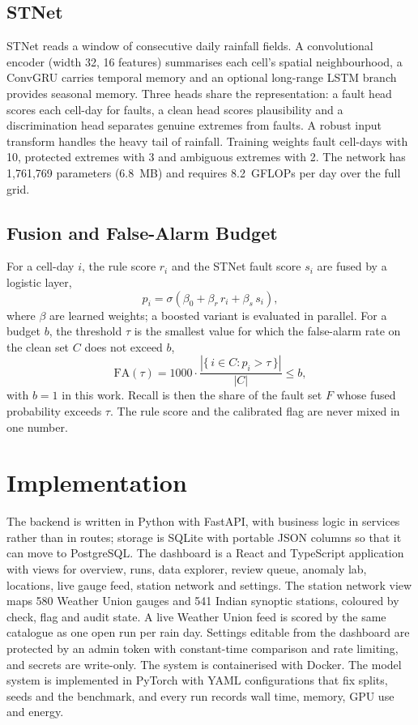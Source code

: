 \documentclass[conference,a4paper]{IEEEtran}
\begin{document}
\subsection{STNet}
STNet reads a window of consecutive daily rainfall fields. A convolutional encoder (width 32, 16 features) summarises each cell's spatial neighbourhood, a ConvGRU carries temporal memory and an optional long-range LSTM branch provides seasonal memory. Three heads share the representation: a fault head scores each cell-day for faults, a clean head scores plausibility and a discrimination head separates genuine extremes from faults. A robust input transform handles the heavy tail of rainfall. Training weights fault cell-days with 10, protected extremes with 3 and ambiguous extremes with 2. The network has 1,761,769 parameters (6.8~MB) and requires 8.2~GFLOPs per day over the full grid.

\subsection{Fusion and False-Alarm Budget}
For a cell-day $i$, the rule score $r_i$ and the STNet fault score $s_i$ are fused by a logistic layer,
\begin{equation}
p_i = \sigma\!\left(\beta_0 + \beta_r\, r_i + \beta_s\, s_i\right),
\label{eq:fusion}
\end{equation}
where $\beta$ are learned weights; a boosted variant is evaluated in parallel. For a budget $b$, the threshold $\tau$ is the smallest value for which the false-alarm rate on the clean set $C$ does not exceed $b$,
\begin{equation}
\mathrm{FA}(\tau) = 1000\cdot\frac{\left|\{\,i\in C : p_i > \tau\,\}\right|}{|C|} \le b,
\label{eq:budget}
\end{equation}
with $b=1$ in this work. Recall is then the share of the fault set $F$ whose fused probability exceeds $\tau$. The rule score and the calibrated flag are never mixed in one number.

\section{Implementation}\label{sec:impl}
The backend is written in Python with FastAPI, with business logic in services rather than in routes; storage is SQLite with portable JSON columns so that it can move to PostgreSQL. The dashboard is a React and TypeScript application with views for overview, runs, data explorer, review queue, anomaly lab, locations, live gauge feed, station network and settings. The station network view maps 580 Weather Union gauges and 541 Indian synoptic stations, coloured by check, flag and audit state. A live Weather Union feed is scored by the same catalogue as one open run per rain day. Settings editable from the dashboard are protected by an admin token with constant-time comparison and rate limiting, and secrets are write-only. The system is containerised with Docker. The model system is implemented in PyTorch with YAML configurations that fix splits, seeds and the benchmark, and every run records wall time, memory, GPU use and energy.
\end{document}
